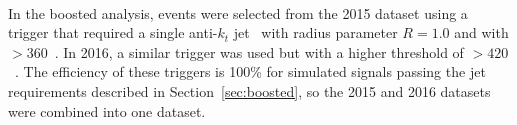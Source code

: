 \paragraph{}
In the boosted analysis, events were selected from the 2015 dataset using a trigger that required a single anti-$k_t$ jet~\cite{Cacciari:2008gp} with radius parameter $R=1.0$ and with \pt$> 360$~\GeV. In 2016, a similar trigger was used but with a higher threshold of \pt$> 420$~\GeV. The efficiency of these triggers is 100\% for simulated signals passing the jet requirements described in Section~\ref{sec:boosted}, so the 2015 and 2016 datasets were combined into one dataset. 
